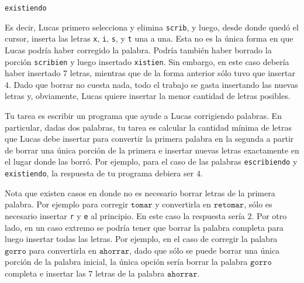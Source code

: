 \documentclass{oci}
\begin{document}
\begin{problemDescription}
\begin{center}
\begin{minipage}{100pt}
    \texttt{exist\caret{}iendo}    
  \end{minipage}
  \end{center}

  Es decir, Lucas primero selecciona y elimina \texttt{scrib}, y luego, desde donde quedó el cursor,
  inserta las letras \texttt{x}, \texttt{i}, \texttt{s}, y \texttt{t} una a una.
  Esta no es la única forma en que Lucas podría haber corregido la palabra.
  Podría también haber borrado la porción \texttt{scribien} y luego insertado
  \texttt{xistien}. Sin embargo, en este caso debería haber insertado 7 letras, mientras
  que de la forma anterior sólo tuvo que insertar $4$.
  Dado que borrar no cuesta nada, todo el trabajo se gasta insertando las nuevas letras y,
  obviamente, Lucas quiere insertar la menor cantidad de letras posibles.

	Tu tarea es escribir un programa que ayude a Lucas corrigiendo palabras.
	En particular, dadas dos palabras, tu tarea es calcular la cantidad mínima de letras
	que Lucas debe insertar para convertir la primera palabra en la segunda a partir de
	borrar una única porción de la primera e insertar nuevas letras exactamente en el lugar donde las borró.
	Por ejemplo, para el caso de las palabras \texttt{escribiendo} y \texttt{existiendo}, la respuesta
	de tu programa debiera ser $4$.
	
	Nota que existen casos en donde no es necesario borrar letras de la primera palabra. 
	Por ejemplo para corregir $\texttt{tomar}$ y convertirla en $\texttt{retomar}$,
	sólo es necesario insertar \texttt{r} y \texttt{e} al principio. En este caso la respuesta sería $2$.
	Por otro lado, en un caso extremo 
	se podría tener que borrar la palabra completa para luego insertar todas las letras.
	Por ejemplo, en el caso de corregir la palabra $\texttt{gorro}$ para convertirla en $\texttt{ahorrar}$,
	dado que sólo se puede borrar una única porción de la palabra inicial,
	la única opción sería borrar la palabra $\texttt{gorro}$ completa e insertar las $7$ letras de la palabra 
	$\texttt{ahorrar}$.
	


\end{problemDescription}
\end{document}
